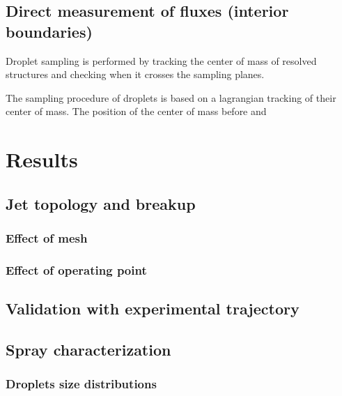\subsection{Direct measurement of fluxes (interior boundaries)}
\label{subsec:ch5_interior_boundaries}

Droplet sampling is performed by tracking the center of mass of resolved structures and checking when it crosses the sampling planes. 



The sampling procedure of droplets is based on a lagrangian tracking of their center of mass. The position of the center of mass before and


\section{Results}
\label{sec:results_JICF_resolved}

\subsection{Jet topology and breakup}

\subsubsection{Effect of mesh}

\subsubsection{Effect of operating point}

\subsection{Validation with experimental trajectory}


\subsection{Spray characterization}






\subsubsection{Droplets size distributions}


